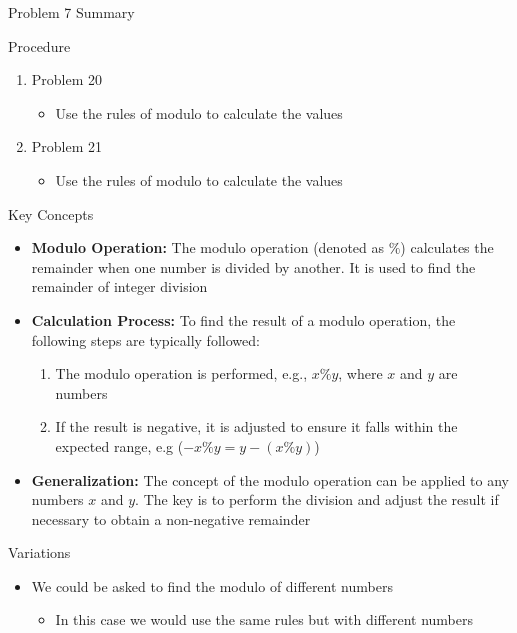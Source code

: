 \begin{summary}{Problem 7 Summary}
    \begin{statement}{Procedure}
        \begin{enumerate}[start = 20]
            \item Problem 20
            \begin{itemize}
                \item Use the rules of modulo to calculate the values
            \end{itemize}
            \item Problem 21
            \begin{itemize}
                \item Use the rules of modulo to calculate the values
            \end{itemize}
        \end{enumerate}
    \end{statement}
    \begin{statement}{Key Concepts}
        \begin{itemize}
            \item \textbf{Modulo Operation:} The modulo operation (denoted as $\%$) calculates the remainder when one number is divided by another. It is used to find the remainder of integer division
            \item \textbf{Calculation Process:} To find the result of a modulo operation, the following steps are typically followed:
            \begin{enumerate}
                \item The modulo operation is performed, e.g., $x \% y$, where $x$ and $y$ are numbers
                \item If the result is negative, it is adjusted to ensure it falls within the expected range, e.g ($-x \% y = y - (x \% y)$)
            \end{enumerate}
            \item \textbf{Generalization:} The concept of the modulo operation can be applied to any numbers $x$ and $y$. The key is to perform the division and adjust the result if necessary to obtain 
            a non-negative remainder
        \end{itemize}
    \end{statement}
    \begin{statement}{Variations}
        \begin{itemize}
            \item We could be asked to find the modulo of different numbers
            \begin{itemize}
                \item In this case we would use the same rules but with different numbers
            \end{itemize}
        \end{itemize}
    \end{statement}
\end{summary}

